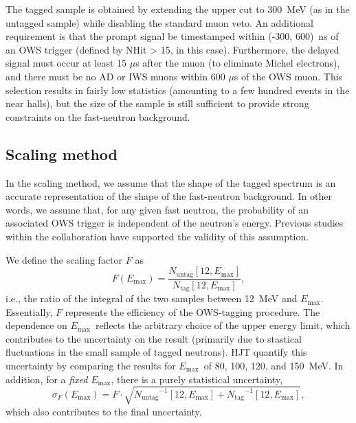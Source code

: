 \documentclass[../thesis.tex]{subfiles}
\begin{document}
The tagged sample is obtained by extending the upper cut to 300~MeV (as in the untagged sample) while disabling the standard muon veto. An additional requirement is that the prompt signal be timestamped within (-300, 600)~ns of an OWS trigger (defined by NHit > 15, in this case). Furthermore, the delayed signal must occur at least 15 $\mu$s after the muon (to eliminate Michel electrons), and there must be no AD or IWS muons within 600 $\mu$s of the OWS muon. This selection results in fairly low statistics (amounting to a few hundred events in the near halls), but the size of the sample is still sufficient to provide strong constraints on the fast-neutron background.

\subsection{Scaling method}
\label{sec:fastn_scaling}

In the scaling method, we assume that the shape of the tagged spectrum is an accurate representation of the shape of the fast-neutron background. In other words, we assume that, for any given fast neutron, the probability of an associated OWS trigger is independent of the neutron's energy. Previous studies within the collaboration have supported the validity of this assumption.

\def\emax{\ensuremath{E_\mathrm{max}}} \def\ntag{\ensuremath{N_\mathrm{tag}}}
\def\nuntag{\ensuremath{N_\mathrm{untag}}}

We define the scaling factor $F$ as \[ F(\emax) = \frac{\nuntag[12, \emax]}{\ntag[12, \emax]}, \] i.e., the ratio of the integral of the two samples between 12~MeV and \emax. Essentially, $F$ represents the efficiency of the OWS-tagging procedure. The dependence on \emax\ reflects the arbitrary choice of the upper energy limit, which contributes to the uncertainty on the result (primarily due to stastical fluctuations in the small sample of tagged neutrons). HJT quantify this uncertainty by comparing the results for \emax\ of 80, 100, 120, and 150~MeV. In addition, for a \emph{fixed} \emax, there is a purely statistical uncertainty,
\[ \sigma_F(\emax) = F \cdot \sqrt{\nuntag^{-1}[12, \emax] + \ntag^{-1}[12,
    \emax]},
\]
which also contributes to the final uncertainty.

\def\nfn{\ensuremath{N_\mathrm{fid}}} \def\rfn{\ensuremath{R_\mathrm{FN}}}
\end{document}
